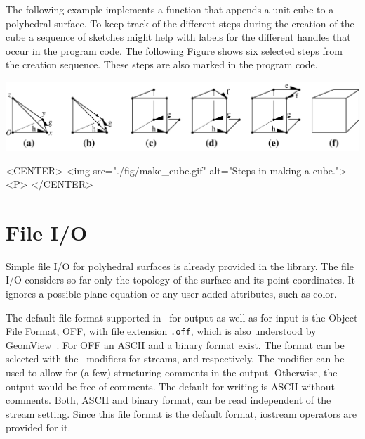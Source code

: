 The following example implements a function that appends a unit cube
to a polyhedral surface. To keep track of the different steps during
the creation of the cube a sequence of sketches might help with labels
for the different handles that occur in the program code. The following
Figure shows six selected steps from the creation sequence. These steps 
are also marked in the program code.

\begin{ccTexOnly}
    \begin{center}
      \parbox{\textwidth}{%
          \includegraphics[width=\textwidth]{Polyhedron/fig/make_cube}%
      }
    \end{center}
\end{ccTexOnly}

\begin{ccHtmlOnly}
    <CENTER>
        <img src="./fig/make_cube.gif" alt="Steps in making a cube."><P>
    </CENTER>
\end{ccHtmlOnly}





\section{File I/O}
\label{sectionPolyIO}

Simple file I/O for polyhedral surfaces is already provided in the
library. The file I/O considers so far only the topology of the
surface and its point coordinates. It ignores a possible plane
equation or any user-added attributes, such as color.

The default file format supported in \cgal\ for output as well as for
input is the Object File Format, OFF, with file extension {\tt .off},
which is also understood by GeomView~\cite{cgal:p-gmgv16-96}. For OFF
an ASCII and a binary format exist. The format can be selected with
the \cgal\ modifiers for streams,  and
 respectively. The modifier 
can be used to allow for (a few) structuring comments in the
output. Otherwise, the output would be free of comments.  The default
for writing is ASCII without comments. Both, ASCII and binary format,
can be read independent of the stream setting. Since this file format
is the default format, iostream operators are provided for it.


